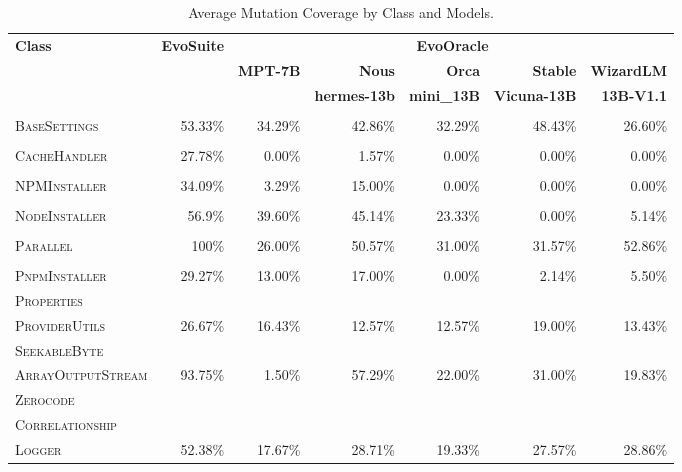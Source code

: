 \begin{table}[H]
\centering

\begin{tabular}{| l | r | r | r | r | r | r |}
\hline
\multirow{2}{*}{\textbf{Class}} & \multirow{2}{*}{\textbf{EvoSuite}} & \multicolumn{5}{c|}{\textbf{EvoOracle}} \\ %
\cline{3-7} %
 &  & \textbf{MPT-7B} & \textbf{Nous} & \textbf{Orca} & \textbf{Stable} & \textbf{WizardLM} \\
 &  &  & \textbf{hermes-13b} & \textbf{mini\_13B} & \textbf{Vicuna-13B} & \textbf{13B-V1.1} \\
\hline
\scriptsize\textsc{} &  &  &  &  &  &  \\
\scriptsize\textsc{BaseSettings} & 53.33\% & 34.29\% & 42.86\% & 32.29\% & 48.43\% & 26.60\% \\
\hline
\scriptsize\textsc{} &  &  &  &  &  &  \\
\scriptsize\textsc{CacheHandler} & 27.78\% & 0.00\% & 1.57\% & 0.00\% & 0.00\% & 0.00\% \\
\hline
\scriptsize\textsc{} &  &  &  &  &  &  \\
\scriptsize\textsc{NPMInstaller} & 34.09\% & 3.29\% & 15.00\% & 0.00\% & 0.00\% & 0.00\% \\
\hline
\scriptsize\textsc{} &  &  &  &  &  &  \\
\scriptsize\textsc{NodeInstaller} & 56.9\% & 39.60\% & 45.14\% & 23.33\% & 0.00\% & 5.14\% \\
\hline
\scriptsize\textsc{} &  &  &  &  &  &  \\
\scriptsize\textsc{Parallel} & 100\% & 26.00\% & 50.57\% & 31.00\% & 31.57\% & 52.86\% \\
\hline
\scriptsize\textsc{} &  &  &  &  &  &  \\
\scriptsize\textsc{PnpmInstaller} & 29.27\% & 13.00\% & 17.00\% & 0.00\% & 2.14\% & 5.50\% \\
\hline
\scriptsize\textsc{Properties} &  &  &  &  &  &  \\
\scriptsize\textsc{ProviderUtils} & 26.67\% & 16.43\% & 12.57\% & 12.57\% & 19.00\% & 13.43\% \\
\hline
\scriptsize\textsc{SeekableByte} &  &  &  &  &  &  \\
\scriptsize\textsc{ArrayOutputStream} & 93.75\% & 1.50\% & 57.29\% & 22.00\% & 31.00\% & 19.83\% \\
\hline
\scriptsize\textsc{Zerocode} &  &  &  &  &  &  \\
\scriptsize\textsc{Correlationship} &  &  &  &  &  &  \\
\scriptsize\textsc{Logger} & 52.38\% & 17.67\% & 28.71\% & 19.33\% & 27.57\% & 28.86\% \\
\hline

\end{tabular}
\caption{Average Mutation Coverage by Class and Models.}
\label{tab:mutation_coverage}
\end{table}

